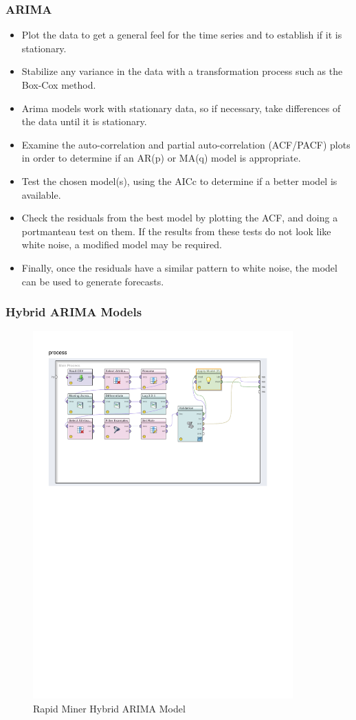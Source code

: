 \documentclass{beamer}
\begin{document}
\begin{frame}
\frametitle{ARIMA}

\begin{itemize}
\item Plot the data to get a general feel for the time series and to establish if it is stationary.  \pause
\item Stabilize any variance in the data with a transformation process such as the Box-Cox method. \pause
\item Arima models work with stationary data, so if necessary, take differences of the data until it is stationary. \pause
\item Examine the auto-correlation and partial auto-correlation (ACF/PACF) plots in order to determine if an AR(p) or MA(q) model is appropriate. \pause
\item Test the chosen model(s), using the AICc to determine if a better model is available. \pause
\item Check the residuals from the best model by plotting the ACF, and doing a portmanteau test on them. If the results from these tests do not look like white noise, a modified model may be required. \pause
\item Finally, once the residuals have a similar pattern to white noise, the model can be used to generate forecasts.   
\end{itemize}

\end{frame}

\begin{frame}
\frametitle{Hybrid ARIMA Models}
\begin{figure}
\centering
\includegraphics[width=10cm]{../Figures/chp_ts_rm_arima}
\caption{Rapid Miner Hybrid ARIMA Model}
\label{fig:chp_ts_rm_arima}
\end{figure}



\end{frame}
\end{document}
